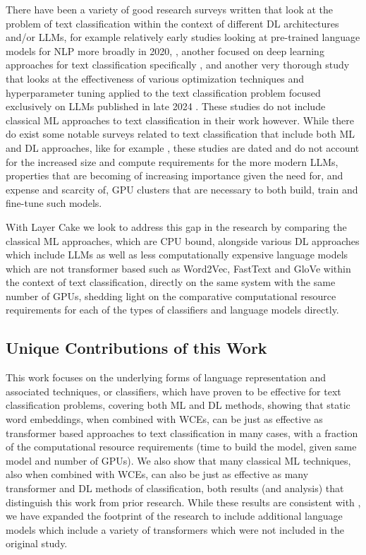 \documentclass[final]{clv2025}
\begin{document}
There have been a variety of good research surveys written that look at the problem of text classification within the context of different DL architectures and/or LLMs, for example relatively early studies looking at pre-trained language models for NLP more broadly in 2020, \cite{qiu2020pre}, another focused on deep learning approaches for text classification specifically \cite{minaee2021deep}, and another very thorough study that looks at the effectiveness of various optimization techniques and hyperparameter tuning applied to the text classification problem focused exclusively on LLMs published in late 2024 \cite{trust2024study}. These studies do not include classical ML approaches to text classification in their work however. While there do exist some notable surveys related to text classification that include both ML and DL approaches, like for example \cite{liu2019roberta}, these studies are dated and do not account for the increased size and compute requirements for the more modern LLMs, properties that are becoming of increasing importance given the need for, and expense and scarcity of, GPU clusters that are necessary to both build, train and fine-tune such models. 

With Layer Cake we look to address this gap in the research by comparing the classical ML approaches, which are CPU bound, alongside various DL approaches which include LLMs as well as less computationally expensive language models which are not transformer based such as Word2Vec, FastText and GloVe within the context of text classification, directly on the same system with the same number of GPUs, shedding light on the comparative computational resource requirements for each of the types of classifiers and language models directly.  

\subsection{Unique Contributions of this Work}

This work focuses on the underlying forms of language representation and associated techniques, or classifiers, which have proven to be effective for text classification problems, covering both ML and DL methods, showing that static word embeddings, when combined with WCEs, can be just as effective as transformer based approaches to text classification in many cases, with a fraction of the computational resource requirements (time to build the model, given same model and number of GPUs). We also show that many classical ML techniques, also when combined with WCEs, can also be just as effective as many transformer and DL methods of classification, both results (and analysis) that distinguish this work from prior research. While these results are consistent with \cite{moreo}, we have expanded the footprint of the research to include additional language models which include a variety of transformers which were not included in the original study.
\end{document}
